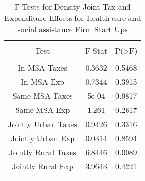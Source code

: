 
\begin{table}[!htbp] \centering 
  \caption{F-Tests for Density Joint Tax and Expenditure Effects for Health care and social assistance Firm Start Ups} 
  \label{62Ftests} 
\begin{tabular}{@{\extracolsep{5pt}} ccc} 
\\[-1.8ex]\hline 
\hline \\[-1.8ex] 
Test & F-Stat & P(\textgreater F) \\ 
\hline \\[-1.8ex] 
In MSA Taxes & 0.3632 & 0.5468 \\ 
In MSA Exp & 0.7344 & 0.3915 \\ 
Same MSA Taxes & 5e-04 & 0.9817 \\ 
Same MSA Exp & 1.261 & 0.2617 \\ 
Jointly Urban Taxes & 0.9426 & 0.3316 \\ 
Jointly Urban Exp & 0.0314 & 0.8594 \\ 
Jointly Rural Taxes & 6.8446 & 0.0089 \\ 
Jointly Rural Exp & 3.9643 & 0.4221 \\ 
\hline \\[-1.8ex] 
\end{tabular} 
\end{table} 
